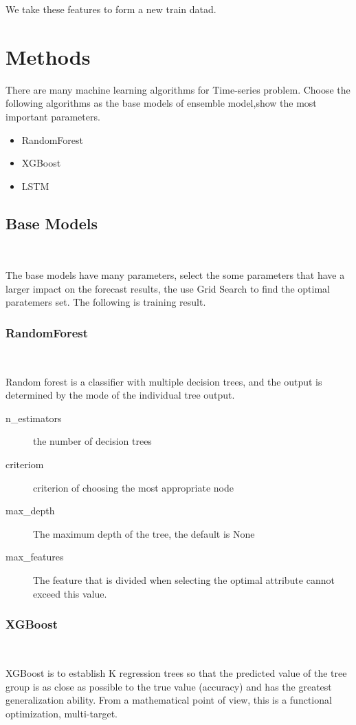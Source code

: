We take these features 
to form a new train datad.


\section{Methods}

There are many machine learning algorithms 
for Time-series problem. 
Choose the following algorithms
as the base models of ensemble model,show the most important parameters.

\begin{itemize}
	\item RandomForest 
	\item XGBoost
	\item LSTM
\end{itemize}
\subsection{Base Models}
\

The base models have many parameters,
select the some parameters that 
have a larger impact on 
the forecast results,
the use Grid Search to find 
the optimal paratemers set.	
The following is training result. 
\subsubsection{RandomForest}
\

Random forest is a classifier with 
multiple decision trees, and
the output is determined by 
the mode of the individual tree output.


\begin{description}
	\item[n_estimators] the number of decision trees
	\item[criteriom] criterion of choosing 
	the most appropriate node
	\item[max_depth] The maximum depth of the tree, 
	the default is None 
	\item[max_features] The feature that is divided 
	when selecting the optimal attribute 
	cannot exceed this value.
\end{description}
                  
	
\subsubsection{XGBoost}
\
 
XGBoost is to establish K regression trees 
so that the predicted value of 
the tree group is as close as possible to 
the true value (accuracy) and 
has the greatest generalization ability. 
From a mathematical point of view, 
this is a functional optimization, multi-target.


